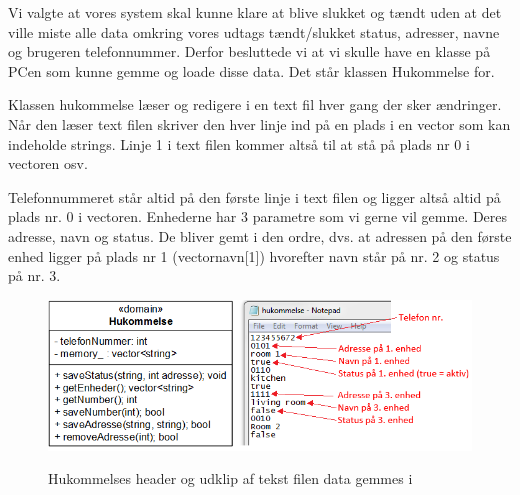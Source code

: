 Vi valgte at vores system skal kunne klare at blive slukket og tændt uden at det ville miste alle data omkring vores udtags tændt/slukket status, adresser, navne og brugeren telefonnummer. Derfor besluttede vi at vi skulle have en klasse på PCen som kunne gemme og loade disse data. Det står klassen Hukommelse for.
\medskip

Klassen hukommelse læser og redigere i en text fil hver gang der sker ændringer. Når den læser text filen skriver den hver linje ind på en plads i en vector som kan indeholde strings. Linje 1 i text filen kommer altså til at stå på plads nr 0 i vectoren osv.

\medskip
Telefonnummeret står altid på den første linje i text filen og ligger altså altid på plads nr. 0 i vectoren. Enhederne har 3 parametre som vi gerne vil gemme. Deres adresse, navn og status. De bliver gemt i den ordre, dvs. at adressen på den første enhed ligger på plads nr 1 (vectornavn[1]) hvorefter navn står på nr. 2 og status på nr. 3.\\

\begin{figure}[!htb]
     {\includegraphics[width=\textwidth]{billeder/uml/PC_dataview}}
     \caption{Hukommelses header og udklip af tekst filen data gemmes i}
     \label{fig:PC_dataview}
\end{figure}